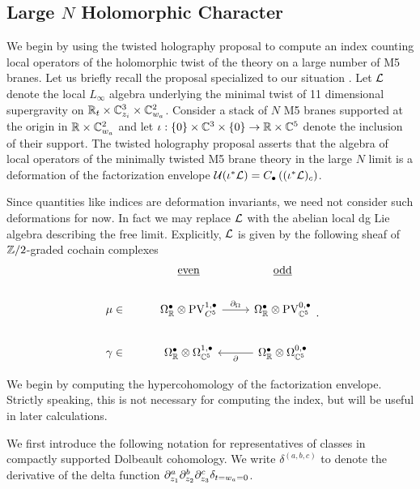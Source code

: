 \subsection{Large $N$ Holomorphic Character}

We begin by using the twisted holography proposal to compute an index counting local operators of the holomorphic twist of the theory on a large number of M5 branes. Let us briefly recall the proposal specialized to our situation . Let $\mathcal L$ denote the local $L_{\infty}$ algebra underlying the minimal twist of 11 dimensional supergravity on $\mathbb{R}_{t}\times \mathbb{C}^{3}_{z_{i}}\times \mathbb{C}^{2}_{w_{a}}$. Consider a stack of $N$ M5 branes supported at the origin in $\mathbb{R}\times \mathbb{C}^{2}_{w_{a}}$ and let $\iota : \{0\}\times \mathbb{C}^{3} \times \{0\}\to \mathbb{R}\times \mathbb{C}^{5}$ denote the inclusion of their support. The twisted holography proposal asserts that the algebra of local operators of the minimally twisted M5 brane theory in the large $N$ limit is a deformation of the factorization envelope $\mathcal U(\iota^{*} \mathcal L) = C_{\bullet}\left ((\iota^{*}\mathcal L)_{c} \right )$.

Since quantities like indices are deformation invariants, we need not consider such deformations for now. In fact we may replace $\mathcal L$ with the abelian local dg Lie algebra describing the free limit. Explicitly, $\mathcal L$ is given by the following sheaf of $\mathbb{Z}/2$-graded cochain complexes

\[
\begin{tikzcd}
  &  \ul{\rm even} & \ul{\rm odd} \\
 \mu \in & \Omega^{\bullet}_{\R}\otimes\PV^{1,\bullet}_{C^{5}} \ar[r, "\del_{\Omega}"] & \Omega^{\bullet}_{\R}\otimes\PV^{0,\bullet}_{\C^{5}}\\
 \gamma \in & \Omega^{\bullet}_{\R}\otimes\Omega^{1,\bullet}_{\C^{5}}& \Omega^{\bullet}_{\R}\otimes\Omega^{0,\bullet}_{\C^{5}} \ar[l, "\del"]
\end{tikzcd}
.\]


\parsec
We begin by computing the hypercohomology of the factorization envelope. Strictly speaking, this is not necessary for computing the index, but will be useful in later calculations.

We first introduce the following notation for representatives of classes in compactly supported Dolbeault cohomology. We write $\delta^{(a,b,c)}$ to denote the derivative of the delta function $\partial_{z_{1}}^{a}\partial_{z_{2}}^{b}\partial_{z_{3}}^{c}\delta_{t=w_{a}=0}$.

